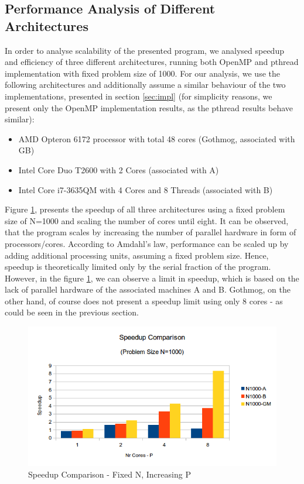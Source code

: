 \documentclass[conference]{IEEEtran}
\begin{document}
\subsection{Performance Analysis of Different Architectures}
\label{sec:analysis:openmp}

In order to analyse scalability of the presented program, we analysed speedup and efficiency of three different architectures, running both OpenMP and pthread implementation with fixed problem size of 1000. For our analysis, we use the following architectures and additionally assume a similar behaviour of the two implementations, presented in section \ref{sec:impl} (for simplicity reasons, we present only the OpenMP implementation results, as the pthread results behave similar):
\begin{itemize}
   \item AMD Opteron 6172 processor with total 48 cores (Gothmog, associated with GB)
   \item Intel Core Duo T2600 with 2 Cores (associated with A)
   \item Intel Core i7-3635QM with 4 Cores and 8 Threads (associated with B)
\end{itemize}

Figure \ref{pic:omp_speedup_comp}, presents the speedup of all three architectures using a fixed problem size of N=1000 and scaling the number of cores until eight. It can be observed, that the program scales by increasing the number of parallel hardware in form of processors/cores. According to Amdahl's law, performance can be scaled up by adding additional processing units, assuming a fixed problem size. Hence, speedup is theoretically limited only by the serial fraction of the program. However, in the figure \ref{pic:omp_speedup_comp}, we can observe a limit in speedup, which is based on the lack of parallel hardware of the associated machines A and B. Gothmog, on the other hand, of course does not present a speedup limit using only 8 cores - as could be seen in the previous section.

\begin{figure}[h]
  \centering
  \includegraphics[scale=0.55]{pic/omp_speedup_comp.png} 
  \caption{Speedup Comparison - Fixed N, Increasing P}
  \label{pic:omp_speedup_comp}
\end{figure}
\end{document}
